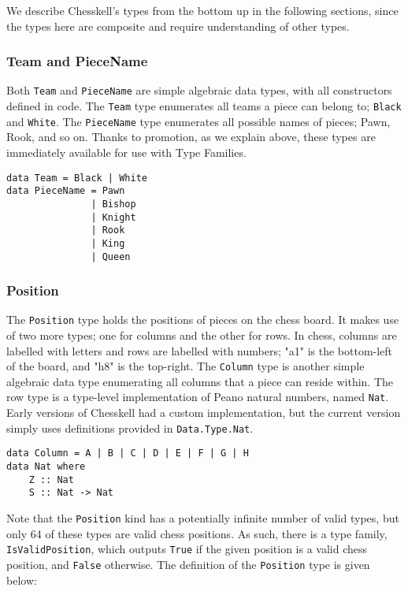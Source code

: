\documentclass[12pt, a4paper, bibliography=totocnumbered]{scrreprt}
\newcommand{\inline}[1]{\lstinline[basicstyle=\ttfamily\footnotesize]{#1}}
\begin{document}
We describe Chesskell's types from the bottom up in the following sections, since the types here are composite and require understanding of other types.

\subsubsection{Team and PieceName}

Both \inline{Team} and \inline{PieceName} are simple algebraic data types, with all constructors defined in code. The \inline{Team} type enumerates all teams a piece can belong to; \inline{Black} and \inline{White}. The \inline{PieceName} type enumerates all possible names of pieces; Pawn, Rook, and so on. Thanks to promotion, as we explain above, these types are immediately available for use with Type Families.

\begin{lstlisting}
data Team = Black | White
data PieceName = Pawn
               | Bishop
               | Knight
               | Rook
               | King
               | Queen
\end{lstlisting}

\subsubsection{Position}

The \inline{Position} type holds the positions of pieces on the chess board. It makes use of two more types; one for columns and the other for rows. In chess, columns are labelled with letters and rows are labelled with numbers; "a1" is the bottom-left of the board, and "h8" is the top-right. The \inline{Column} type is another simple algebraic data type enumerating all columns that a piece can reside within. The row type is a type-level implementation of Peano natural numbers, named \inline{Nat}. Early versions of Chesskell had a custom implementation, but the current version simply uses definitions provided in \inline{Data.Type.Nat}.

\begin{lstlisting}
data Column = A | B | C | D | E | F | G | H
data Nat where
    Z :: Nat
    S :: Nat -> Nat
\end{lstlisting}

Note that the \inline{Position} kind has a potentially infinite number of valid types, but only 64 of these types are valid chess positions. As such, there is a type family, \inline{IsValidPosition}, which outputs \inline{True} if the given position is a valid chess position, and \inline{False} otherwise. The definition of the \inline{Position} type is given below:
\end{document}
